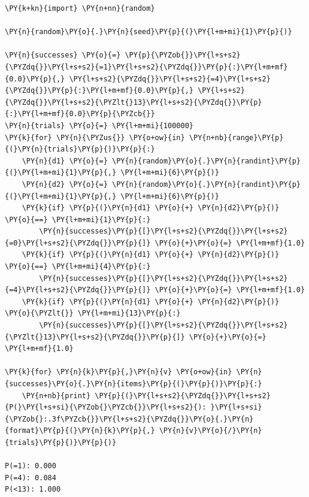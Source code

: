 \begin{Answer}
\begin{codebox}[size=fbox, boxrule=1pt, colback=cellbackground, colframe=cellborder]
\begin{Verbatim}[commandchars=\\\{\}]
\PY{k+kn}{import} \PY{n+nn}{random}
	
\PY{n}{random}\PY{o}{.}\PY{n}{seed}\PY{p}{(}\PY{l+m+mi}{1}\PY{p}{)}
	
\PY{n}{successes} \PY{o}{=} \PY{p}{\PYZob{}}\PY{l+s+s2}{\PYZdq{}}\PY{l+s+s2}{=1}\PY{l+s+s2}{\PYZdq{}}\PY{p}{:}\PY{l+m+mf}{0.0}\PY{p}{,} \PY{l+s+s2}{\PYZdq{}}\PY{l+s+s2}{=4}\PY{l+s+s2}{\PYZdq{}}\PY{p}{:}\PY{l+m+mf}{0.0}\PY{p}{,} \PY{l+s+s2}{\PYZdq{}}\PY{l+s+s2}{\PYZlt{}13}\PY{l+s+s2}{\PYZdq{}}\PY{p}{:}\PY{l+m+mf}{0.0}\PY{p}{\PYZcb{}}
\PY{n}{trials} \PY{o}{=} \PY{l+m+mi}{100000}
\PY{k}{for} \PY{n}{\PYZus{}} \PY{o+ow}{in} \PY{n+nb}{range}\PY{p}{(}\PY{n}{trials}\PY{p}{)}\PY{p}{:}
    \PY{n}{d1} \PY{o}{=} \PY{n}{random}\PY{o}{.}\PY{n}{randint}\PY{p}{(}\PY{l+m+mi}{1}\PY{p}{,} \PY{l+m+mi}{6}\PY{p}{)}
    \PY{n}{d2} \PY{o}{=} \PY{n}{random}\PY{o}{.}\PY{n}{randint}\PY{p}{(}\PY{l+m+mi}{1}\PY{p}{,} \PY{l+m+mi}{6}\PY{p}{)}
    \PY{k}{if} \PY{p}{(}\PY{n}{d1} \PY{o}{+} \PY{n}{d2}\PY{p}{)} \PY{o}{==} \PY{l+m+mi}{1}\PY{p}{:}
        \PY{n}{successes}\PY{p}{[}\PY{l+s+s2}{\PYZdq{}}\PY{l+s+s2}{=0}\PY{l+s+s2}{\PYZdq{}}\PY{p}{]} \PY{o}{+}\PY{o}{=} \PY{l+m+mf}{1.0}
    \PY{k}{if} \PY{p}{(}\PY{n}{d1} \PY{o}{+} \PY{n}{d2}\PY{p}{)} \PY{o}{==} \PY{l+m+mi}{4}\PY{p}{:}
        \PY{n}{successes}\PY{p}{[}\PY{l+s+s2}{\PYZdq{}}\PY{l+s+s2}{=4}\PY{l+s+s2}{\PYZdq{}}\PY{p}{]} \PY{o}{+}\PY{o}{=} \PY{l+m+mf}{1.0}
    \PY{k}{if} \PY{p}{(}\PY{n}{d1} \PY{o}{+} \PY{n}{d2}\PY{p}{)} \PY{o}{\PYZlt{}} \PY{l+m+mi}{13}\PY{p}{:}
        \PY{n}{successes}\PY{p}{[}\PY{l+s+s2}{\PYZdq{}}\PY{l+s+s2}{\PYZlt{}13}\PY{l+s+s2}{\PYZdq{}}\PY{p}{]} \PY{o}{+}\PY{o}{=} \PY{l+m+mf}{1.0}
	
\PY{k}{for} \PY{n}{k}\PY{p}{,}\PY{n}{v} \PY{o+ow}{in} \PY{n}{successes}\PY{o}{.}\PY{n}{items}\PY{p}{(}\PY{p}{)}\PY{p}{:}
    \PY{n+nb}{print} \PY{p}{(}\PY{l+s+s2}{\PYZdq{}}\PY{l+s+s2}{P(}\PY{l+s+si}{\PYZob{}\PYZcb{}}\PY{l+s+s2}{): }\PY{l+s+si}{\PYZob{}:.3f\PYZcb{}}\PY{l+s+s2}{\PYZdq{}}\PY{o}{.}\PY{n}{format}\PY{p}{(}\PY{n}{k}\PY{p}{,} \PY{n}{v}\PY{o}{/}\PY{n}{trials}\PY{p}{)}\PY{p}{)}
	
P(=1): 0.000
P(=4): 0.084
P(<13): 1.000
\end{Verbatim}
\end{codebox}
\end{Answer}


